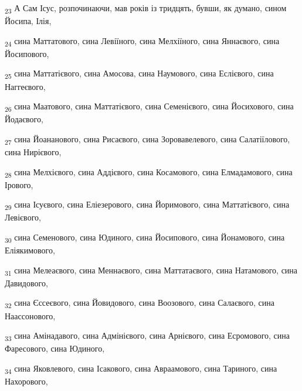 \begin{tcolorbox}
\textsubscript{23} А Сам Ісус, розпочинаючи, мав років із тридцять, бувши, як думано, сином Йосипа, Ілія,
\end{tcolorbox}
\begin{tcolorbox}
\textsubscript{24} сина Маттатового, сина Левіїного, сина Мелхіїного, сина Яннаєвого, сина Йосипового,
\end{tcolorbox}
\begin{tcolorbox}
\textsubscript{25} сина Маттатієвого, сина Амосова, сина Наумового, сина Еслієвого, сина Наггеєвого,
\end{tcolorbox}
\begin{tcolorbox}
\textsubscript{26} сина Маатового, сина Маттатієвого, сина Семенієвого, сина Йосихового, сина Йодаєвого,
\end{tcolorbox}
\begin{tcolorbox}
\textsubscript{27} сина Йоананового, сина Рисаєвого, сина Зоровавелевого, сина Салатіїлового, сина Нирієвого,
\end{tcolorbox}
\begin{tcolorbox}
\textsubscript{28} сина Мелхієвого, сина Аддієвого, сина Косамового, сина Елмадамового, сина Ірового,
\end{tcolorbox}
\begin{tcolorbox}
\textsubscript{29} сина Ісуєвого, сина Еліезерового, сина Йоримового, сина Маттатієвого, сина Левієвого,
\end{tcolorbox}
\begin{tcolorbox}
\textsubscript{30} сина Семенового, сина Юдиного, сина Йосипового, сина Йонамового, сина Еліякимового,
\end{tcolorbox}
\begin{tcolorbox}
\textsubscript{31} сина Мелеаєвого, сина Меннаєвого, сина Маттатаєвого, сина Натамового, сина Давидового,
\end{tcolorbox}
\begin{tcolorbox}
\textsubscript{32} сина Єссеєвого, сина Йовидового, сина Воозового, сина Салаєвого, сина Наассонового,
\end{tcolorbox}
\begin{tcolorbox}
\textsubscript{33} сина Амінадавого, сина Адмінієвого, сина Арнієвого, сина Есромового, сина Фаресового, сина Юдиного,
\end{tcolorbox}
\begin{tcolorbox}
\textsubscript{34} сина Яковлевого, сина Ісакового, сина Авраамового, сина Тариного, сина Нахорового,
\end{tcolorbox}
